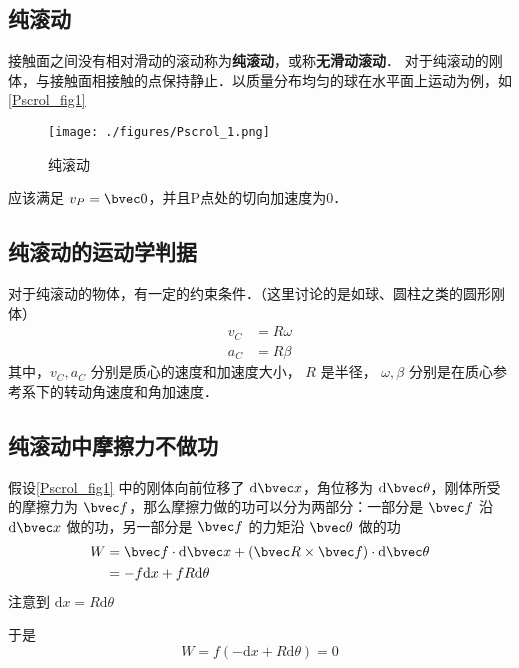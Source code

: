 


\subsection{纯滚动}
接触面之间没有相对滑动的滚动称为\textbf{纯滚动}，或称\textbf{无滑动滚动}．
对于纯滚动的刚体，与接触面相接触的点保持静止．以质量分布均匀的球在水平面上运动为例，如\autoref{Pscrol_fig1}
\begin{figure}[ht]
\centering
\texttt{[image: ./figures/Pscrol\_1.png]}
\caption{纯滚动} \label{Pscrol_fig1}
\end{figure}
应该满足 $v_P=\bvec 0$，并且P点处的切向加速度为0．

\subsection{纯滚动的运动学判据}
对于纯滚动的物体，有一定的约束条件．（这里讨论的是如球、圆柱之类的圆形刚体）
\begin{equation}
\begin{aligned}
v_C&=R\omega\\
a_C&=R\beta
\end{aligned}
\end{equation}
其中，$v_C,a_C$
分别是质心的速度和加速度大小，
$R$ 是半径，
$\omega,\beta$ 分别是在质心参考系下的转动角速度和角加速度．

\subsection{纯滚动中摩擦力不做功}
假设\autoref{Pscrol_fig1} 中的刚体向前位移了 $\mathrm{d}\bvec x$，角位移为 $\mathrm{d} \bvec \theta$，刚体所受的摩擦力为 $\bvec f$，那么摩擦力做的功可以分为两部分：一部分是 $\bvec f$ 沿 $\mathrm{d} \bvec x$ 做的功，另一部分是 $\bvec f$ 的力矩沿 $\bvec \theta$ 做的功
\begin{equation}
\begin{aligned}
W&=\bvec f\cdot\mathrm{d} \bvec x+(\bvec R\times \bvec f)\cdot\mathrm{d} \bvec \theta\\
&=-f\mathrm{d} x+fR\mathrm{d} \theta
\end{aligned}
\end{equation}
注意到 $\mathrm{d} x=R\mathrm{d} \theta$

于是\begin{equation}
W=f(-\mathrm{d} x+R\mathrm{d} \theta)=0
\end{equation}
